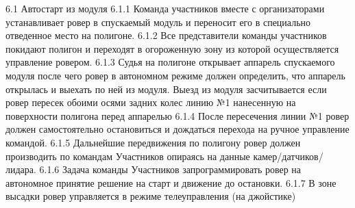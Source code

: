 \begin{table}
\begin{longtable}
6.1 Автостарт из модуля
6.1.1 Команда участников вместе с организаторами устанавливает ровер в спускаемый модуль и переносит его в специально отведенное место на полигоне.
6.1.2 Все представители команды участников покидают полигон и переходят в огороженную зону из которой осуществляется управление  ровером.
6.1.3 Судья на полигоне открывает аппарель спускаемого модуля после чего ровер в автономном режиме должен определить, что аппарель открылась и выехать по ней из модуля. Выезд из модуля засчитывается если ровер пересек обоими осями задних колес линию №1 нанесенную на поверхности полигона перед аппарелью
6.1.4 После пересечения линии №1 ровер должен самостоятельно остановиться и дождаться перехода на ручное управление командой.
6.1.5 Дальнейшие передвижения по полигону ровер должен производить по командам Участников опираясь на данные камер/датчиков/лидара.
6.1.6 Задача команды Участников запрограммировать ровер на автономное принятие решение на старт и движение до остановки. 
6.1.7 В зоне высадки ровер управляется в режиме телеуправления (на джойстике)


\end{longtable}
\end{table}
